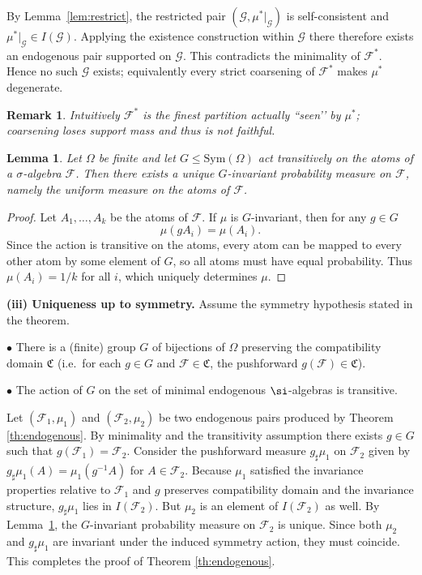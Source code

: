\documentclass[
 amsmath,amssymb,
  onecolumn %
]{revtex4-2}
\newtheorem{lemma}[theorem]{Lemma}
\newtheorem{remark}[theorem]{Remark}
\begin{document}
By Lemma~\ref{lem:restrict}, the restricted pair
$(\mathcal G,\mu^{\ast}|_{\mathcal G})$ is self-consistent and
$\mu^{\ast}|_{\mathcal G}\in I(\mathcal G)$.
Applying the existence construction within $\mathcal G$
there therefore exists an endogenous pair supported on $\mathcal G$.
This contradicts the minimality of $\mathcal F^{\ast}$.
Hence no such $\mathcal G$ exists; equivalently every strict
coarsening of $\mathcal F^{\ast}$ makes $\mu^{\ast}$ degenerate.


\begin{remark} Intuitively $\mathcal F^{\ast}$ is the finest partition actually “seen’’ by $\mu^{\ast}$; coarsening loses support mass and thus is not faithful.
\end{remark} 

\begin{lemma}\label{lem:ergodic}
Let $\Omega$ be finite and let $G\leq \mathrm{Sym}(\Omega)$ act transitively
on the atoms of a $\sigma$-algebra $\mathcal F$.
Then there exists a unique $G$-invariant probability measure on $\mathcal F$,
namely the uniform measure on the atoms of $\mathcal F$.
\end{lemma}

\begin{proof}
Let $A_1,\dots,A_k$ be the atoms of $\mathcal F$.
If $\mu$ is $G$-invariant, then for any $g\in G$
\[
\mu(gA_i)=\mu(A_i).
\]
Since the action is transitive on the atoms, every atom can be mapped to
every other atom by some element of $G$, so all atoms must have equal
probability.
Thus $\mu(A_i)=1/k$ for all $i$, which uniquely determines $\mu$.
\end{proof}

\medskip
\noindent\textbf{(iii) Uniqueness up to symmetry.}
Assume the symmetry hypothesis stated in the theorem.
\medskip

$\bullet$	There is a (finite) group $G$ of bijections of $\Omega$ preserving the compatibility domain $\mathfrak{C}$ (i.e.\ for each $g\in G$ and $\mathcal F\in\mathfrak{C}$,
the pushforward $g(\mathcal F)\in\mathfrak{C}$).

\medskip

$\bullet$	The action of $G$ on the set of minimal endogenous $\si$-algebras is transitive.

\medskip

Let $(\mathcal F_1,\mu_1)$ and $(\mathcal F_2,\mu_2)$ be two endogenous pairs produced by Theorem \ref{th:endogenous}. By minimality and the transitivity assumption there exists $g\in G$ such that $g(\mathcal F_1)=\mathcal F_2$. Consider the pushforward measure $g_\sharp \mu_1$ on $\mathcal F_2$ given by $g_\sharp \mu_1(A)=\mu_1(g^{-1}A)$ for $A\in\mathcal F_2$. Because $\mu_1$ satisfied the invariance properties relative to $\mathcal F_1$ and $g$ preserves compatibility domain and the invariance structure, $g_\sharp \mu_1$ lies in $I(\mathcal F_2)$. But $\mu_2$ is an element of $I(\mathcal F_2)$ as well.  By Lemma~\ref{lem:ergodic}, the $G$-invariant probability measure on
$\mathcal F_2$ is unique.
Since both $\mu_2$ and $g_\sharp\mu_1$ are invariant under the induced
symmetry action, they must coincide.
This completes the proof of Theorem \ref{th:endogenous}. 
\end{document}
